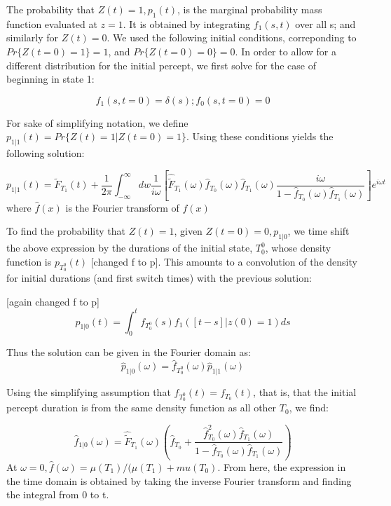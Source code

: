 \documentclass[10pt]{article}
\begin{document}
The probability that $Z(t)=1, p_1(t)$, is the marginal probability mass function evaluated at $z=1$. It is obtained by integrating $f_1(s,t)$ over all s; and similarly for $Z(t)=0$.
We used the following initial conditions, correponding to $Pr \lbrace Z(t=0)=1 \rbrace=1$, and $Pr \lbrace Z(t=0)=0 \rbrace = 0$. In order to allow for a different distribution for the initial percept, we first solve for the case of beginning in state 1:

\begin{equation}
f_1(s,t=0) = \delta(s); f_0(s,t=0) = 0
\end{equation} 

For sake of simplifying notation, we define $p_{1|1}(t)=Pr \lbrace Z(t)=1|Z(t=0)=1 \rbrace$. Using these conditions yields the following solution:

\begin{equation}
p_{1|1}(t) = \tilde{F}_{T_1}(t) + \frac{1}{2\pi} \int_{-\infty}^\infty dw \frac{1}{i\omega} \left[ \hat{\tilde{F}}_{T_1}(\omega) \hat{f}_{T_0}(\omega)\hat{f}_{T_1}(\omega) \frac{i\omega}{1 - \hat{f}_{T_0}(\omega)\hat{f}_{T_1}(\omega)} \right] e^{i \omega t}
\end{equation}
where $\hat{f}(x)$ is the Fourier transform of $f(x)$

To find the probability that $Z(t)=1$, given $Z(t=0)=0, p_{1|0}$, we time shift the above expression by the durations of the initial state, $T_0^0$, whose density function is $p_{T_0^0}(t)$ [changed f to p]. This amounts to a convolution of the density for initial durations (and first switch times) with the previous solution:

[again changed f to p]
\begin{equation}
p_{1|0}(t) = \int_0^t f_{T_0^0}(s) f_{1}([t-s]|z(0)=1) ds
\end{equation}

Thus the solution can be given in the Fourier domain as:
\begin{equation}
\hat{p}_{1|0}(\omega) = \hat{f}_{T_0^0}(\omega) \hat{p}_{1|1} (\omega)
\end{equation}

Using the simplifying assumption that ${f}_{T_0^0}(t) = {f}_{T_0}(t)$, that is, that the initial percept duration is from the same density function as all other $T_0$, we find:
 
\begin{equation}
\hat{f}_{1|0}(\omega) = \hat{\tilde{F}}_{T_1}(\omega)
\left( \hat{f}_{T_0} + \frac{\hat{f}_{T_0}^2(\omega)\hat{f}_{T_1}(\omega)}{1-\hat{f}_{T_0}(\omega)\hat{f}_{T_1}(\omega)}\right)
\end{equation}
At $\omega = 0, \hat{f}(\omega) = \mu(T_1) / (\mu(T_1) + mu(T_0)$. From here, the expression in the time domain is obtained by taking the inverse Fourier transform and finding the integral from 0 to t.  
\end{document}
